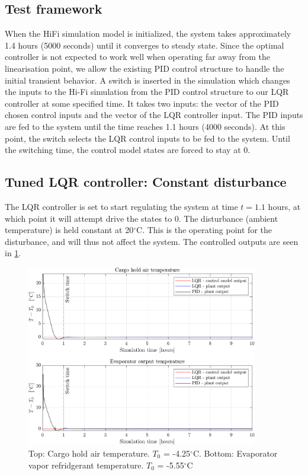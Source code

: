 \subsection{Test framework}
When the HiFi simulation model is initialized, the system takes approximately 1.4 hours (5000 seconds) until it converges to steady state. Since the optimal controller is not expected to work well when operating far away from the linearisation point, we allow the existing PID control structure to handle the initial transient behavior.
A switch is inserted in the simulation which changes the inputs to the Hi-Fi simulation from the PID control structure to our LQR controller at some specified time. It takes two inputs: the vector of the PID chosen control inputs and the vector of the LQR controller input. The PID inputs are fed to the system until the time reaches 1.1 hours (4000 seconds). At this point, the switch selects the LQR control inputs to be fed to the system. Until the switching time, the control model states are forced to stay at 0. \\

\subsection{Tuned LQR controller: Constant disturbance}
The LQR controller is set to start regulating the system at time $t=1.1$ hours, at which point it will attempt drive the states to 0. The disturbance (ambient temperature) is held constant at 20$^{\circ}$C. This is the operating point for the disturbance, and will thus not affect the system. The controlled outputs are seen in \cref{fig:LQR_wellTuned_noDist}.\\


\begin{figure}[h!]
	\centering
	\includegraphics[width=0.9\textwidth]{Graphics/fig_LQRvsKresten_noDist.png}
	\caption{Top: Cargo hold air temperature. $T_0$ = -4.25$^{\circ}$C. Bottom: Evaporator vapor refridgerant temperature. $T_0$ = -5.55$^{\circ}$C}
	\label{fig:LQR_wellTuned_noDist}
\end{figure}

